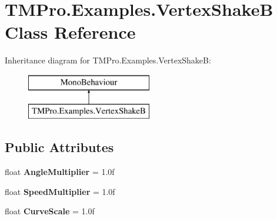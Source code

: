 \hypertarget{class_t_m_pro_1_1_examples_1_1_vertex_shake_b}{}\section{T\+M\+Pro.\+Examples.\+Vertex\+ShakeB Class Reference}
\label{class_t_m_pro_1_1_examples_1_1_vertex_shake_b}
Inheritance diagram for T\+M\+Pro.\+Examples.\+Vertex\+ShakeB\+:\begin{figure}[H]
\begin{center}
\leavevmode
\includegraphics[height=2.000000cm]{class_t_m_pro_1_1_examples_1_1_vertex_shake_b}
\end{center}
\end{figure}
\subsection*{Public Attributes}
\begin{DoxyCompactItemize}
\item 
\mbox{\label{class_t_m_pro_1_1_examples_1_1_vertex_shake_b_a25046a446241c10abe00a455b8860c7f}} 
float {\bfseries Angle\+Multiplier} = 1.\+0f
\item 
\mbox{\label{class_t_m_pro_1_1_examples_1_1_vertex_shake_b_ac278e62e3d4b818697ca09ee9bbcfc77}} 
float {\bfseries Speed\+Multiplier} = 1.\+0f
\item 
\mbox{\label{class_t_m_pro_1_1_examples_1_1_vertex_shake_b_ab3c2718cdb0b13d63b37cc869801ce88}} 
float {\bfseries Curve\+Scale} = 1.\+0f
\end{DoxyCompactItemize}
